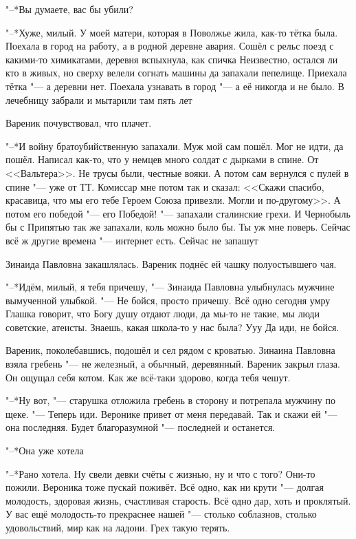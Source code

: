 "--*Вы думаете, вас бы убили?

"--*Хуже, милый.
У моей матери, которая в Поволжье жила, как-то тётка была.
Поехала в город на работу, а в родной деревне авария.
Сошёл с рельс поезд с какими-то химикатами, деревня вспыхнула, как спичка\ldotst
Неизвестно, остался ли кто в живых, но сверху велели согнать машины да запахали пепелище. 
Приехала тётка "--- а деревни нет.
Поехала узнавать в город "--- а её никогда и не было.
В лечебницу забрали и мытарили там пять лет\ldotst

Вареник почувствовал, что плачет.

"--*И войну братоубийственную запахали.
Муж мой сам пошёл.
Мог не идти, да пошёл.
Написал как-то, что у немцев много солдат с дырками в спине.
От <<Вальтера>>.
Не трусы были, честные вояки.
А потом сам вернулся с пулей в спине "--- уже от ТТ.
Комиссар мне потом так и сказал: <<Скажи спасибо, красавица, что мы его тебе Героем Союза привезли.
Могли и по-другому>>.
А потом его победой "--- его Победой! "--- запахали сталинские грехи. 
И Чернобыль бы с Припятью так же запахали, коль можно было бы.
Ты уж мне поверь. 
Сейчас всё ж другие времена "--- интернет есть.
Сейчас не запашут\ldotst

Зинаида Павловна закашлялась.
Вареник поднёс ей чашку полуостывшего чая.

"--*Идём, милый, я тебя причешу, "--- Зинаида Павловна улыбнулась мужчине вымученной улыбкой.
"--- Не бойся, просто причешу.
Всё одно сегодня умру\ldotst
Глашка говорит, что Богу душу отдают люди, да мы-то не такие, мы люди советские, атеисты.
Знаешь, какая школа-то у нас была?
Ууу\ldotst
Да иди, не бойся.

Вареник, поколебавшись, подошёл и сел рядом с кроватью.
Зинаина Павловна взяла гребень "--- не железный, а обычный, деревянный.
Вареник закрыл глаза.
Он ощущал себя котом.
Как же всё-таки здорово, когда тебя чешут.

"--*Ну вот, "--- старушка отложила гребень в сторону и потрепала мужчину по щеке.
"--- Теперь иди.
Веронике привет от меня передавай.
Так и скажи ей "--- она последняя.
Будет благоразумной "--- последней и останется.

"--*Она уже хотела\ldotst

"--*Рано хотела.
Ну свели девки счёты с жизнью, ну и что с того?
Они-то пожили.
Вероника тоже пускай поживёт.
Всё одно, как ни крути "--- долгая молодость, здоровая жизнь, счастливая старость.
Всё одно дар, хоть и проклятый.
У вас ещё молодость-то прекраснее нашей "--- столько соблазнов, столько удовольствий, мир как на ладони.
Грех такую терять.

